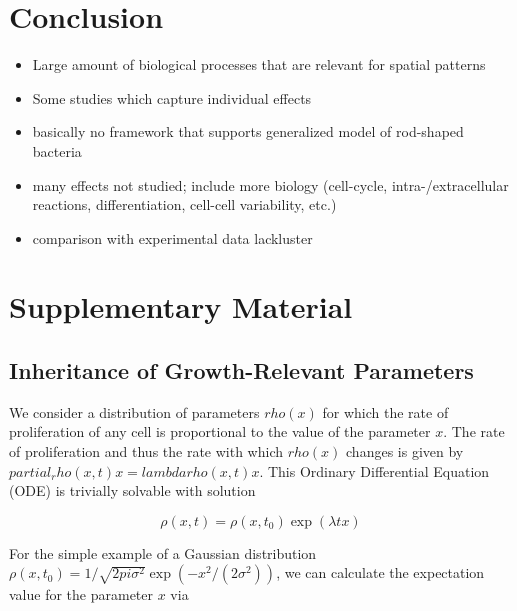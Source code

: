 \documentclass{article}
\begin{document}
\section{Conclusion}

\begin{itemize}
    \item Large amount of biological processes that are relevant for spatial patterns
    \item Some studies which capture individual effects
    \item basically no framework that supports generalized model of rod-shaped bacteria
    \item many effects not studied; include more biology (cell-cycle, intra-/extracellular
        reactions, differentiation, cell-cell variability, etc.)
    \item comparison with experimental data lackluster
\end{itemize}




\renewcommand{\thesection}{}
\renewcommand{\thesubsection}{S\arabic{subsection}}

\section{Supplementary Material}
\subsection{Inheritance of Growth-Relevant Parameters}

We consider a distribution of parameters $rho(x)$ for
which the rate of proliferation of any cell is proportional to the value of the parameter $x$.
The rate of proliferation and thus the rate with which $rho(x)$ changes is given by
$partial_rho(x,t) x = lambda rho(x,t) x$.
This Ordinary Differential Equation (ODE) is trivially solvable with solution

\begin{equation}
    \rho(x,t) = \rho(x,t_0) \exp(\lambda t x)
\end{equation}

For the simple example of a Gaussian distribution
$\rho(x,t_0) = 1/\sqrt{2 pi \sigma^2} \exp(-x^2/(2 \sigma^2))$, we can calculate the expectation
value for the parameter $x$ via
\end{document}
